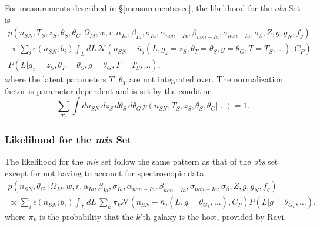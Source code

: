\documentclass[preprint,3p]{elsarticle}
\begin{document}
%

%

For measurements described in \S\ref{measurements:sec}, the likelihood for the {\it obs} Set is
\begin{multline}
p(n_{SN}, {{T}}_S,{{z}}_S, \theta_{S}, \theta_G |  \Omega_M, w, r, \alpha_{Ia}, \beta_{Ia},\sigma_{Ia}, \alpha_{\mathit{non-Ia}},\beta_{\mathit{non-Ia}}, \sigma_{\mathit{non-Ia}},  \sigma_\beta, Z, g, g_N, f_g)\\
\propto \sum_i  \epsilon(n_{SN}; b_{i})  \int_L dL\, 
\mathcal{N}\left(n_{SN} - \overline{n}_j(L ,
g_z=z_S, \theta_T=\theta_S, g=\theta_G, T=T_S, \ldots), C_P \right)\\
P(L|g_z=z_S, \theta_T=\theta_S, g=\theta_G, T=T_S, \ldots),
\end{multline} 
where the latent parameters $T$, $\theta_T$ are not integrated over.
The normalization factor is parameter-dependent and is set by the condition
\begin{equation}
\sum_{T_S} \int dn_{SN}\,d{{z}}_S\,d\theta_{S}\,d\theta_G\,p(n_{SN}, {{T}}_S,{{z}}_S, \theta_{S}, \theta_G |  \ldots)=1.
\end{equation}  

\subsubsection{Likelihood for the {\it mis} Set}
The likelihood for the {\it mis} set follow the same pattern as that of the
{\it obs} set except for not having to account for spectroscopic data.
\begin{multline}
p(n_{SN}, \theta_{G_1} |  \Omega_M, w, r, \alpha_{Ia}, \beta_{Ia},\sigma_{Ia}, \alpha_{\mathit{non-Ia}},\beta_{\mathit{non-Ia}}, \sigma_{\mathit{non-Ia}},  \sigma_\beta, Z, g, g_N, f_g) \\
 \propto \sum_i  \epsilon(n_{SN}; b_{i}) 
\int_L dL\, 
\sum_k 
\pi_k\mathcal{N}\left(n_{SN} - \overline{n}_j(L ,
g=\theta_{G_k}, \ldots), C_P \right)
P(L|g=\theta_{G_k}, \ldots), 
\end{multline} 
where $\pi_k$ is the probability that the $k$'th galaxy is the host, provided by Ravi.
\end{document}
